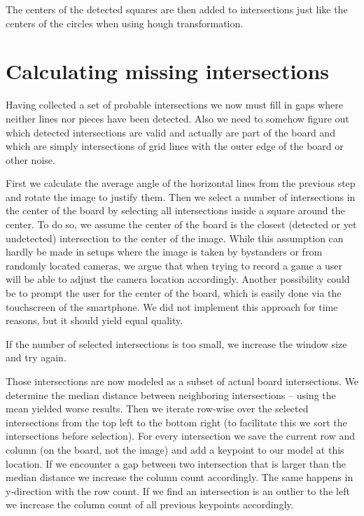 	The centers of the detected squares are then added to intersections just like the centers of the circles when using hough transformation.

	\section{Calculating missing intersections}
	Having collected a set of probable intersections we now must fill in gaps where neither lines nor pieces have been detected. Also we need to somehow figure out which detected intersections are valid and actually are part of the board and which are simply intersections of grid lines with the outer edge of the board or other noise.

	First we calculate the average angle of the horizontal lines from the previous step and rotate the image to justify them. Then we select a number of intersections in the center of the board by selecting all intersections inside a square around the center. To do so, we assume the center of the board is the closest (detected or yet undetected) intersection to the center of the image. While this assumption can hardly be made in setups where the image is taken by bystanders or from randomly located cameras, we argue that when trying to record a game a user will be able to adjust the camera location accordingly. Another possibility could be to prompt the user for the center of the board, which is easily done via the touchscreen of the smartphone. We did not implement this approach for time reasons, but it should yield equal quality.

	If the number of selected intersections is too small, we increase the window size and try again.

	Those intersections are now modeled as a subset of actual board intersections. We determine the median distance between neighboring intersections -- using the mean yielded worse results. Then we iterate row-wise over the selected intersections from the top left to the bottom right (to facilitate this we sort the intersections before selection). For every intersection we save the current row and column (on the board, not the image) and add a keypoint to our model at this location. If we encounter a gap between two intersection that is larger than the median distance we increase the column count accordingly. The same happens in y-direction with the row count. If we find an intersection is an outlier to the left we increase the column count of all previous keypoints accordingly.


